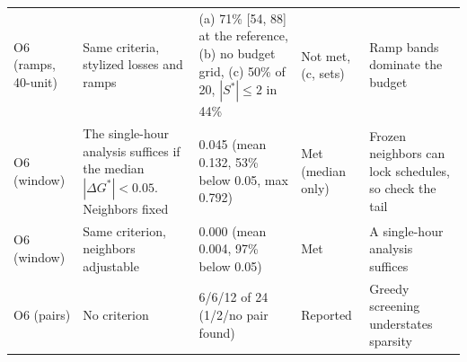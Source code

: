 \begin{tabular}{@{}p{1.9cm}p{5.6cm}p{3.9cm}p{1.5cm}p{3.3cm}@{}}
O6 (ramps, 40-unit) & Same criteria, stylized losses and ramps & (a) 71\% [54, 88] at the reference, (b) no budget grid, (c) 50\% of 20, $|S^{*}|\le2$ in 44\% & Not met, (c, sets) & Ramp bands dominate the budget \\
O6 (window) & The single-hour analysis suffices if the median $|\Delta G^{*}|<0.05$. Neighbors fixed & 0.045 (mean 0.132, 53\% below 0.05, max 0.792) & Met (median only) & Frozen neighbors can lock schedules, so check the tail \\
O6 (window) & Same criterion, neighbors adjustable & 0.000 (mean 0.004, 97\% below 0.05) & Met & A single-hour analysis suffices \\
O6 (pairs) & No criterion & 6/6/12 of 24 (1/2/no pair found) & Reported & Greedy screening understates sparsity \\
\bottomrule
\end{tabular}
